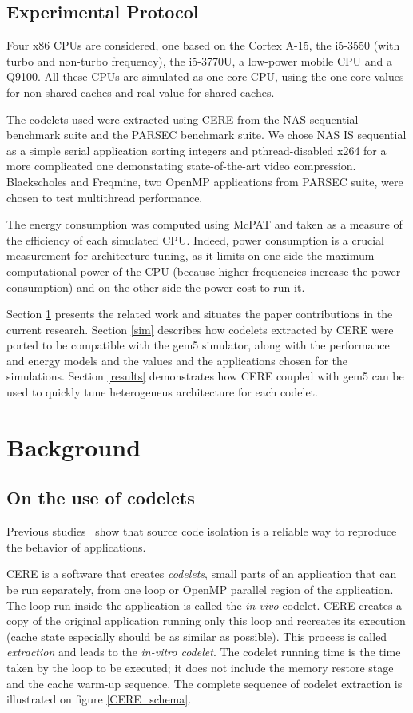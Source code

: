 \documentclass{article}
\begin{document}
\begin{multicols}{2}
\subsection{Experimental Protocol}
Four x86 CPUs are considered, one based on the Cortex A-15\cite{DBLP:conf/samos/EndoCC14}, the i5-3550 (with turbo and non-turbo frequency), the i5-3770U, a low-power mobile CPU and a Q9100. All these CPUs are simulated as one-core CPU, using the one-core values for non-shared caches and real value for shared caches.

The codelets used were extracted using CERE\cite{CERE} from the NAS\cite{NAS} sequential benchmark suite and the PARSEC\cite{PARSEC} benchmark suite. We chose NAS IS sequential as a simple serial application sorting integers and pthread-disabled x264 for a more complicated one demonstating state-of-the-art video compression. Blackscholes and Freqmine, two OpenMP applications from PARSEC suite, were chosen to test multithread performance.


The energy consumption was computed using McPAT\cite{McPAT} and taken as a measure of the efficiency of each simulated CPU. Indeed, power consumption is a crucial measurement for architecture tuning, as it limits on one side the maximum computational power of the CPU (because higher frequencies increase the power consumption) and on the other side the power cost to run it.

Section \ref{bckgrnd} presents the related work and situates the paper contributions in the current research. Section \ref{sim} describes how codelets extracted by CERE were ported to be compatible with the gem5 simulator, along with the performance and energy models and the values and the applications chosen for the simulations. Section \ref{results} demonstrates how CERE coupled with gem5 can be used to quickly tune heterogeneus architecture for each codelet.


\section{Background}
\label{bckgrnd}

\subsection{On the use of codelets}
Previous studies~\cite{CERE} show that source code isolation is a reliable way to reproduce the behavior of applications. 

CERE is a software that creates \textit{codelets}, small parts of an application that can be run separately, from one loop 
or OpenMP parallel region of the application.
The loop run inside the application is called the \textit{in-vivo} codelet. CERE creates a copy of the original application running only this loop and recreates its execution (cache state especially should be as similar as possible). This process is called \textit{extraction} and leads to the \textit{in-vitro codelet}. The codelet running time is the time taken by the loop to be executed; it does not include the memory restore stage and the cache warm-up sequence. The complete sequence of codelet extraction is illustrated on figure \ref{CERE_schema}.



\end{multicols}
\end{document}
